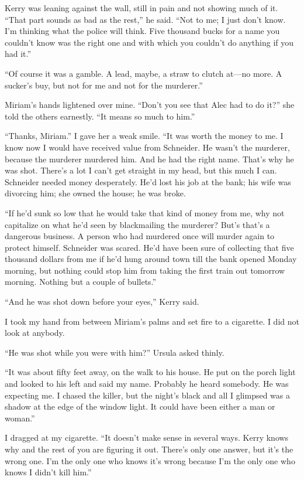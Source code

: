 \documentclass{novel}
\begin{document}
\scenestars

Kerry was leaning against the wall, still in pain and not showing much of it. “That part sounds as bad as the rest,” he said. “Not to me; I just don’t know. I’m thinking what the police will think. Five thousand bucks for a name you couldn’t know was the right one and with which you couldn’t do anything if you had it.”

“Of course it was a gamble. A lead, maybe, a straw to clutch at—no more. A sucker’s buy, but not for me and not for the murderer.”

Miriam’s hands lightened over mine. “Don’t you see that Alec had to do it?” she told the others earnestly. “It means so much to him.”

“Thanks, Miriam.” I gave her a weak smile. “It was worth the money to me. I know now I would have received value from Schneider. He wasn’t the murderer, because the murderer murdered him. And he had the right name. That’s why he was shot. There’s a lot I can’t get straight in my head, but this much I can. Schneider needed money desperately. He’d lost his job at the bank; his wife was divorcing him; she owned the house; he was broke. 

“If he’d sunk so low that he would take that kind of money from me, why not capitalize on what he’d seen by blackmailing the murderer? But’s that’s a dangerous business. A person who had murdered once will murder again to protect himself. Schneider was scared. He’d have been sure of collecting that five thousand dollars from me if he’d hung around town till the bank opened Monday morning, but nothing could stop him from taking the first train out tomorrow morning. Nothing but a couple of bullets.”

“And he was shot down before your eyes,” Kerry said.

I took my hand from between Miriam’s palms and set fire to a cigarette. I did not look at anybody.

“He was shot while you were with him?” Ursula asked thinly.

“It was about fifty feet away, on the walk to his house. He put on the porch light and looked to his left and said my name. Probably he heard somebody. He was expecting me. I chased the killer, but the night’s black and all I glimpsed was a shadow at the edge of the window light. It could have been either a man or woman.”

I dragged at my cigarette. “It doesn’t make sense in several ways. Kerry knows why and the rest of you are figuring it out. There’s only one answer, but it’s the wrong one. I’m the only one who knows it’s wrong because I’m the only one who knows I didn’t kill him.”
\end{document}
